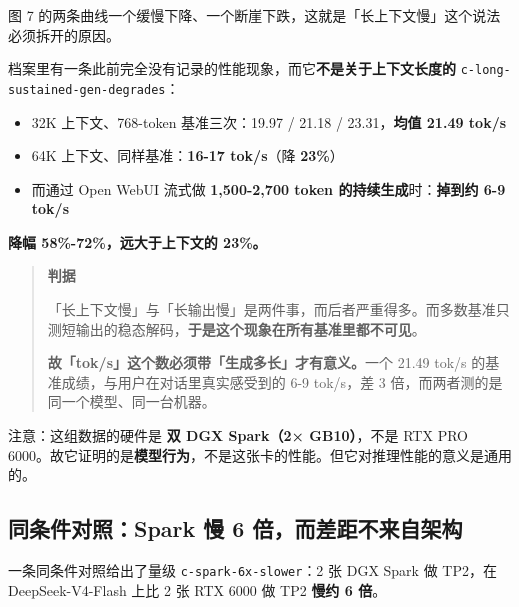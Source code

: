 图 7 的两条曲线一个缓慢下降、一个断崖下跌，这就是「长上下文慢」这个说法必须拆开的原因。


档案里有一条此前完全没有记录的性能现象，而它\textbf{不是关于上下文长度的} {\scriptsize\texttt{c-\hspace{0pt}long-\hspace{0pt}sustained-\hspace{0pt}gen-\hspace{0pt}degrades}}：


\begin{itemize}
  \item 32K 上下文、768-token 基准三次：19.97 / 21.18 / 23.31，\textbf{均值 21.49 tok/s}
  \item 64K 上下文、同样基准：\textbf{16-\hspace{0pt}17 tok/s}（降 \textbf{23\%}）
  \item 而通过 Open WebUI 流式做 \textbf{1,500-\hspace{0pt}2,700 token 的持续生成}时：\textbf{掉到约 6-\hspace{0pt}9 tok/s}
\end{itemize}

\textbf{降幅 58\%-\hspace{0pt}72\%，远大于上下文的 23\%。}


\begin{quote}\small
\textbf{ 判据}

「长上下文慢」与「长输出慢」是两件事，而后者严重得多。而多数基准只测短输出的稳态解码，\textbf{于是这个现象在所有基准里都不可见}。

\textbf{故「tok/s」这个数必须带「生成多长」才有意义。}一个 21.49 tok/s 的基准成绩，与用户在对话里真实感受到的 6-\hspace{0pt}9 tok/s，差 3 倍，而两者测的是同一个模型、同一台机器。

\end{quote}

注意：这组数据的硬件是 \textbf{双 DGX Spark（2× GB10）}，不是 RTX PRO 6000。故它证明的是\textbf{模型行为}，不是这张卡的性能。但它对推理性能的意义是通用的。


\subsection{同条件对照：Spark 慢 6 倍，而差距不来自架构}

一条同条件对照给出了量级 {\scriptsize\texttt{c-\hspace{0pt}spark-\hspace{0pt}6x-\hspace{0pt}slower}}：2 张 DGX Spark 做 TP2，在 DeepSeek-V4-Flash 上比 2 张 RTX 6000 做 TP2 \textbf{慢约 6 倍}。


